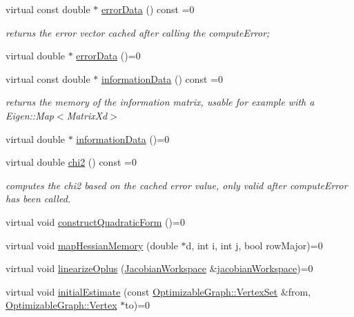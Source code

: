 \begin{DoxyCompactItemize}
\item 
virtual const double $\ast$ \mbox{\hyperlink{classg2o_1_1_optimizable_graph_1_1_edge_a5f2a4b6efa2d0ae600f94a28a6ba58cf}{error\+Data}} () const =0
\begin{DoxyCompactList}\small\item\em returns the error vector cached after calling the compute\+Error; \end{DoxyCompactList}\item 
virtual double $\ast$ \mbox{\hyperlink{classg2o_1_1_optimizable_graph_1_1_edge_a460a0cb0256b0a91edb131e25181f57b}{error\+Data}} ()=0
\item 
virtual const double $\ast$ \mbox{\hyperlink{classg2o_1_1_optimizable_graph_1_1_edge_ab5b315b3e0a6c4e29074b2c924460417}{information\+Data}} () const =0
\begin{DoxyCompactList}\small\item\em returns the memory of the information matrix, usable for example with a Eigen\+::\+Map$<$\+Matrix\+Xd$>$ \end{DoxyCompactList}\item 
virtual double $\ast$ \mbox{\hyperlink{classg2o_1_1_optimizable_graph_1_1_edge_a99de4bbb57e3c5e7321f150a45d1cb12}{information\+Data}} ()=0
\item 
virtual double \mbox{\hyperlink{classg2o_1_1_optimizable_graph_1_1_edge_a182bd2c109d50283c638d9b295f2f3d7}{chi2}} () const =0
\begin{DoxyCompactList}\small\item\em computes the chi2 based on the cached error value, only valid after compute\+Error has been called. \end{DoxyCompactList}\item 
virtual void \mbox{\hyperlink{classg2o_1_1_optimizable_graph_1_1_edge_a56fbf3430ddf591e3c619bdd1b7e4499}{construct\+Quadratic\+Form}} ()=0
\item 
virtual void \mbox{\hyperlink{classg2o_1_1_optimizable_graph_1_1_edge_a3bd233fd552daa166039acf47b69a5a7}{map\+Hessian\+Memory}} (double $\ast$d, int i, int j, bool row\+Major)=0
\item 
virtual void \mbox{\hyperlink{classg2o_1_1_optimizable_graph_1_1_edge_a0fdad5ebfb4efec9f893b57f67e0fbe1}{linearize\+Oplus}} (\mbox{\hyperlink{classg2o_1_1_jacobian_workspace}{Jacobian\+Workspace}} \&\mbox{\hyperlink{structg2o_1_1_optimizable_graph_aa669dbd1d6e34e49fecda711ff1b78c6}{jacobian\+Workspace}})=0
\item 
virtual void \mbox{\hyperlink{classg2o_1_1_optimizable_graph_1_1_edge_a9519f8892e97f03daacb44ea50ac7f4e}{initial\+Estimate}} (const \mbox{\hyperlink{classg2o_1_1_hyper_graph_a703938cdb4bb636860eed55a2489d70c}{Optimizable\+Graph\+::\+Vertex\+Set}} \&from, \mbox{\hyperlink{classg2o_1_1_optimizable_graph_1_1_vertex}{Optimizable\+Graph\+::\+Vertex}} $\ast$to)=0

\end{DoxyCompactItemize}
